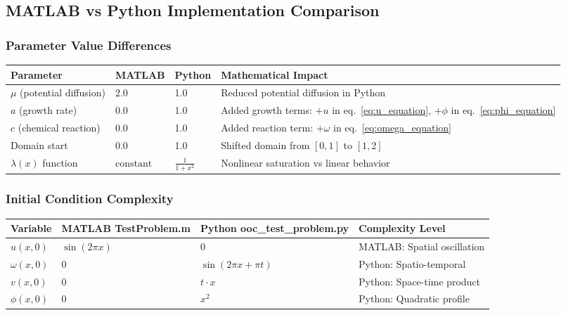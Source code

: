 \subsection{MATLAB vs Python Implementation Comparison}
\label{subsec:comprehensive_comparison}

\subsubsection{Parameter Value Differences}

\begin{longtable}{|p{2.5cm}|p{2cm}|p{2cm}|p{6.5cm}|}
\hline
\textbf{Parameter} & \textbf{MATLAB} & \textbf{Python} & \textbf{Mathematical Impact} \\
\hline
\endhead

$\mu$ (potential diffusion) & 2.0 & 1.0 & Reduced potential diffusion in Python \\
\hline

$a$ (growth rate) & 0.0 & 1.0 & Added growth terms: $+u$ in eq.~\eqref{eq:u_equation}, $+\phi$ in eq.~\eqref{eq:phi_equation} \\
\hline

$c$ (chemical reaction) & 0.0 & 1.0 & Added reaction term: $+\omega$ in eq.~\eqref{eq:omega_equation} \\
\hline

Domain start & 0.0 & 1.0 & Shifted domain from $[0,1]$ to $[1,2]$ \\
\hline

$\lambda(x)$ function & $\text{constant}$ & $\frac{1}{1+x^2}$ & Nonlinear saturation vs linear behavior \\
\hline

\end{longtable}

\subsubsection{Initial Condition Complexity}

\begin{longtable}{|p{2cm}|p{3.5cm}|p{3.5cm}|p{4cm}|}
\hline
\textbf{Variable} & \textbf{MATLAB TestProblem.m} & \textbf{Python ooc\_test\_problem.py} & \textbf{Complexity Level} \\
\hline
\endhead

$u(x,0)$ & $\sin(2\pi x)$ & $0$ & MATLAB: Spatial oscillation \\
\hline

$\omega(x,0)$ & $0$ & $\sin(2\pi x + \pi t)$ & Python: Spatio-temporal \\
\hline

$v(x,0)$ & $0$ & $t \cdot x$ & Python: Space-time product \\
\hline

$\phi(x,0)$ & $0$ & $x^2$ & Python: Quadratic profile \\
\hline

\end{longtable}


